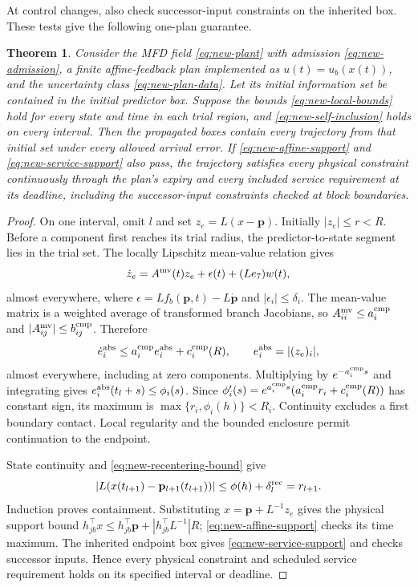 \documentclass[preprint,12pt]{elsarticle}
\theoremstyle{definition}
\theoremstyle{plain}
\newtheorem{theorem}{Theorem}
\theoremstyle{definition}
\theoremstyle{plain}
\begin{document}
At control changes, also check successor-input constraints on the
inherited box. These tests give the following one-plan guarantee.

\begin{theorem}
\label{thm:new-plan-enclosure}
Consider the MFD field \eqref{eq:new-plant} with admission
\eqref{eq:new-admission}, a finite affine-feedback plan implemented as
$u(t)=u_b(x(t))$, and the uncertainty
class \eqref{eq:new-plan-data}. Let its initial information set be contained
in the initial predictor box. Suppose the bounds
\eqref{eq:new-local-bounds} hold for every state and time in each trial
region, and
\eqref{eq:new-self-inclusion} holds on every interval. Then the propagated
boxes contain every trajectory from that initial set under every allowed
arrival error. If \eqref{eq:new-affine-support} and
\eqref{eq:new-service-support} also pass, the trajectory satisfies every
physical constraint continuously through the plan's expiry and every included
service requirement at its deadline, including the successor-input
constraints checked at block boundaries.
\end{theorem}

\begin{proof}
On one interval, omit $l$ and set $z_e=L(x-\mathbf p)$.
Initially $|z_e|\le r<R$. Before a component first reaches its trial
radius, the predictor-to-state segment lies in the trial set. The
locally Lipschitz mean-value relation \cite{clarke1990optimization} gives
\begin{equation}
\dot z_e=A^{\rm mv}(t)z_e+\epsilon(t)+(Le_7)w(t),
\label{eq:new-error-dynamics}
\end{equation}
almost everywhere, where $\epsilon=Lf_b(\mathbf p,t)-L\dot{\mathbf p}$
and $|\epsilon_i|\le\delta_i$. The mean-value
matrix is a weighted average of transformed branch Jacobians, so
$A_{ii}^{\rm mv}\le a_i^{\rm cmp}$ and
$|A_{ij}^{\rm mv}|\le b_{ij}^{\rm cmp}$. Therefore
\begin{equation}
\dot e_i^{\rm abs}\le a_i^{\rm cmp}e_i^{\rm abs}+c_i^{\rm cmp}(R),
\qquad e_i^{\rm abs}=|(z_e)_i|,
\label{eq:new-error-comparison-proof}
\end{equation}
almost everywhere, including at zero components. Multiplying by
$e^{-a_i^{\rm cmp}s}$ and integrating gives
$e_i^{\rm abs}(t_l+s)\le\phi_i(s)$. Since
$\phi_i'(s)=e^{a_i^{\rm cmp}s}(a_i^{\rm cmp}r_i+c_i^{\rm cmp}(R))$
has constant sign, its maximum is
$\max\{r_i,\phi_i(h)\}<R_i$. Continuity excludes a first boundary
contact. Local regularity and the bounded enclosure permit continuation
to the endpoint.

State continuity and \eqref{eq:new-recentering-bound} give
\[
|L(x(t_{l+1})-\mathbf p_{l+1}(t_{l+1}))|
\le\phi(h)+\delta_l^{\rm rec}=r_{l+1}.
\]
Induction proves containment. Substituting $x=\mathbf p+L^{-1}z_e$
gives the physical support bound
$h_{jb}^\top x\le h_{jb}^\top\mathbf p+|h_{jb}^\top L^{-1}|R$;
\eqref{eq:new-affine-support} checks its time maximum. The inherited
endpoint box gives \eqref{eq:new-service-support} and checks successor
inputs. Hence every physical constraint and scheduled service requirement
holds on its specified interval or deadline.
\end{proof}
\end{document}
